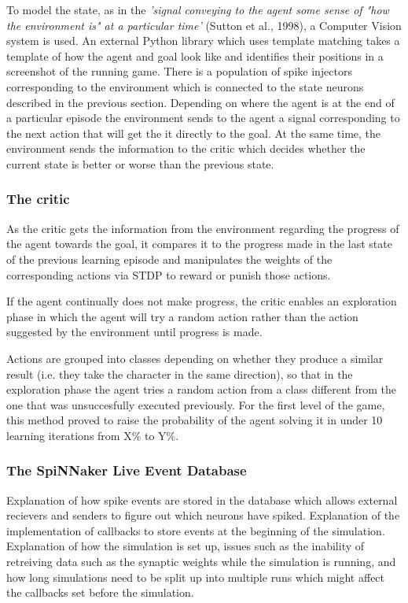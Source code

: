 \documentclass[10pt]{article}
\begin{document}
    To model the state, as in the \textit{'signal conveying to the agent some sense of "how the environment is" at a particular time'} (Sutton et al., 1998), a Computer Vision system is used. An external Python library which uses template matching takes a template of how the agent and goal look like and identifies their positions in a screenshot of the running game. There is a population of spike injectors corresponding to the environment which is connected to the state neurons described in the previous section. Depending on where the agent is at the end of a particular episode the environment sends to the agent a signal corresponding to the next action that will get the it directly to the goal. At the same time, the environment sends the information to the critic which decides whether the current state is better or worse than the previous state.

    \subsubsection{The critic}

    As the critic gets the information from the environment regarding the progress of the agent towards the goal, it compares it to the progress made in the last state of the previous learning episode and manipulates the weights of the corresponding actions via STDP to reward or punish those actions.

    If the agent continually does not make progress, the critic enables an exploration phase in which the agent will try a random action rather than the action suggested by the environment until progress is made.

    Actions are grouped into classes depending on whether they produce a similar result (i.e. they take the character in the same direction), so that in the exploration phase the agent tries a random action from a class different from the one that was unsuccesfully executed previously. For the first level of the game, this method proved to raise the probability of the agent solving it in under 10 learning iterations from X\% to Y\%.

    \subsubsection{The SpiNNaker Live Event Database}

    Explanation of how spike events are stored in the database which allows external recievers and senders to figure out which neurons have spiked. Explanation of the implementation of callbacks to store events at the beginning of the simulation. Explanation of how the simulation is set up, issues such as the inability of retreiving data such as the synaptic weights while the simulation is running, and how long simulations need to be split up into multiple runs which might affect the callbacks set before the simulation.
\end{document}
